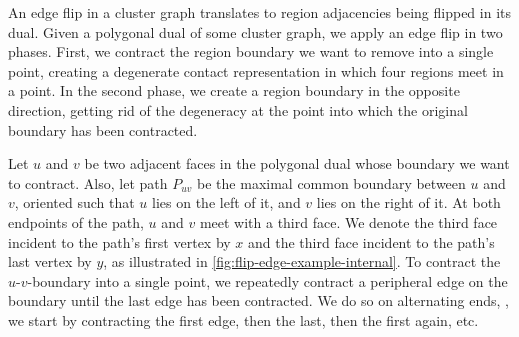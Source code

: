 An edge flip in a cluster graph translates to region adjacencies being flipped in its dual.
Given a polygonal dual of some cluster graph, we apply an edge flip in two phases.
First, we contract the region boundary we want to remove into a single point, creating a degenerate contact representation in which four regions meet in a point.
In the second phase, we create a region boundary in the opposite direction, getting rid of the degeneracy at the point into which the original boundary has been contracted.

Let $u$ and $v$ be two adjacent faces in the polygonal dual whose boundary we want to contract.
Also, let path $P_{uv}$ be the maximal common boundary between $u$ and $v$, oriented such that $u$ lies on the left of it, and $v$ lies on the right of it.
At both endpoints of the path, $u$ and $v$ meet with a third face.
We denote the third face incident to the path's first vertex by $x$ and the third face incident to the path's last vertex by $y$, as illustrated in \cref{fig:flip-edge-example-internal}.
To contract the $u$-$v$-boundary into a single point, we repeatedly contract a peripheral edge on the boundary until the last edge has been contracted.
We do so on alternating ends, \ie{}, we start by contracting the first edge, then the last, then the first again, etc.


